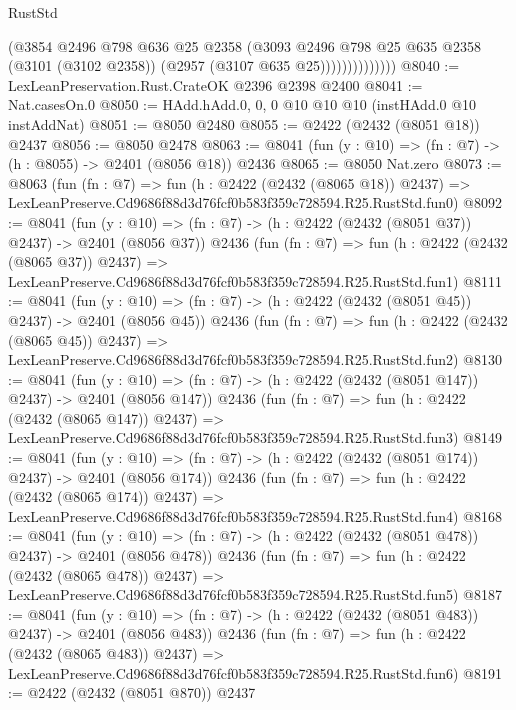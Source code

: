 \begin{lexlean}{RustStd}
\begin{coremodule}
                        (@3854
                          @2496
                          @798
                          @636
                          @25
                          @2358
                          (@3093
                            @2496
                            @798
                            @25
                            @635
                            @2358
                            (@3101 (@3102 @2358))
                            (@2957 (@3107 @635 @25))))))))))))))
@8040 := LexLeanPreservation.Rust.CrateOK @2396 @2398 @2400
@8041 := Nat.casesOn.{0}
@8050 := HAdd.hAdd.{0, 0, 0} @10 @10 @10 (instHAdd.{0} @10 instAddNat)
@8051 := @8050 @2480
@8055 := @2422 (@2432 (@8051 @18)) @2437
@8056 := @8050 @2478
@8063 := @8041 (fun (y : @10) => (fn : @7) -> (h : @8055) -> @2401 (@8056 @18)) @2436
@8065 := @8050 Nat.zero
@8073 := @8063
    (fun (fn : @7) =>
    fun (h : @2422 (@2432 (@8065 @18)) @2437) =>
    LexLeanPreserve.Cd9686f88d3d76fcf0b583f359c728594.R25.RustStd.fun0)
@8092 := @8041
    (fun (y : @10) => (fn : @7) -> (h : @2422 (@2432 (@8051 @37)) @2437) -> @2401 (@8056 @37))
    @2436
    (fun (fn : @7) =>
    fun (h : @2422 (@2432 (@8065 @37)) @2437) =>
    LexLeanPreserve.Cd9686f88d3d76fcf0b583f359c728594.R25.RustStd.fun1)
@8111 := @8041
    (fun (y : @10) => (fn : @7) -> (h : @2422 (@2432 (@8051 @45)) @2437) -> @2401 (@8056 @45))
    @2436
    (fun (fn : @7) =>
    fun (h : @2422 (@2432 (@8065 @45)) @2437) =>
    LexLeanPreserve.Cd9686f88d3d76fcf0b583f359c728594.R25.RustStd.fun2)
@8130 := @8041
    (fun (y : @10) => (fn : @7) -> (h : @2422 (@2432 (@8051 @147)) @2437) -> @2401 (@8056 @147))
    @2436
    (fun (fn : @7) =>
    fun (h : @2422 (@2432 (@8065 @147)) @2437) =>
    LexLeanPreserve.Cd9686f88d3d76fcf0b583f359c728594.R25.RustStd.fun3)
@8149 := @8041
    (fun (y : @10) => (fn : @7) -> (h : @2422 (@2432 (@8051 @174)) @2437) -> @2401 (@8056 @174))
    @2436
    (fun (fn : @7) =>
    fun (h : @2422 (@2432 (@8065 @174)) @2437) =>
    LexLeanPreserve.Cd9686f88d3d76fcf0b583f359c728594.R25.RustStd.fun4)
@8168 := @8041
    (fun (y : @10) => (fn : @7) -> (h : @2422 (@2432 (@8051 @478)) @2437) -> @2401 (@8056 @478))
    @2436
    (fun (fn : @7) =>
    fun (h : @2422 (@2432 (@8065 @478)) @2437) =>
    LexLeanPreserve.Cd9686f88d3d76fcf0b583f359c728594.R25.RustStd.fun5)
@8187 := @8041
    (fun (y : @10) => (fn : @7) -> (h : @2422 (@2432 (@8051 @483)) @2437) -> @2401 (@8056 @483))
    @2436
    (fun (fn : @7) =>
    fun (h : @2422 (@2432 (@8065 @483)) @2437) =>
    LexLeanPreserve.Cd9686f88d3d76fcf0b583f359c728594.R25.RustStd.fun6)
@8191 := @2422 (@2432 (@8051 @870)) @2437

\end{coremodule}
\end{lexlean}
